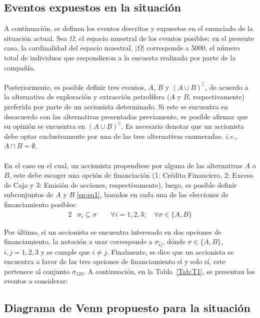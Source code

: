 \documentclass[paper=letterpaper]{article}
\begin{document}
\subsection{Eventos expuestos en la situación}
A continuación, se definen los eventos descritos y expuestos en el enunciado de la situación actual. Sea $\Omega$, el espacio muestral de los eventos posibles; en el presente caso, la cardinalidad del espacio muestral, $\vert \Omega \vert$ corresponde a 5000, el n\'{u}mero total de individuos que respondieron a la encuesta realizada por parte de la compa\~n\'{i}a. 
\\
\\
Posteriormente, es posible definir tres eventos, $A$, $B$ y $(A \cup B)^{\complement}$, de acuerdo a la alternativa de exploraci\'{o}n y extracci\'{o}n petrol\'{i}fera ($A$ y $B$, respectivamente) preferida por parte de un accionista determinado. Si este se encuentra en desacuerdo con las alternativas presentadas previamente, es posible afirmar que su opini\'{o}n se encuentra en $(A \cup B)^{\complement}$. Es necesario denotar que un accionista debe optar exclusivamente por una de las tres alternativas enumeradas. \textit{i.e.,} $A \cap B = \emptyset$.
\\
\\
En el caso en el cual, un accionista propendiese por alguna de las alternativas $A$ o $B$, este debe escoger una opci\'{o}n de financiaci\'{o}n (1: Crédito Financiero, 2: Exceso de Caja y 3: Emisi\'{o}n de acciones, respectivamente), luego, es posible definir subconjuntos de $A$ y $B$ \eqref{eq:eq1}, basados en cada una de las elecciones de financiamiento posibles: 
\begin{alignat}{2}
        &\sigma_i \subseteq \sigma  \qquad \forall i = 1,2,3; \quad \forall \sigma \in \{A,B\} \label{eq:eq1} 
\end{alignat}

Por \'{u}ltimo, si un accionista se encuentra interesado en dos opciones de financiamiento, la notaci\'{o}n a usar corresponde a $\sigma_{ij}$, d\'{o}nde $\sigma \in \{A, B\}$, $i,j = 1,2,3$ y se cumple que $i \neq j$. Finalmente, se dice que un accionista se encuentra a favor de las tres opciones de financiamiento s\'{i} y solo s\'{i}, este pertenece al conjunto $\sigma_{123}$. A continuación, en la Tabla~\ref{Tab:T1}, se presentan los eventos a considerar:


\subsection{Diagrama de Venn propuesto para la situaci\'{o}n}
\end{document}

